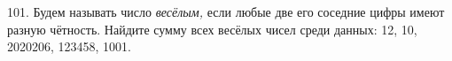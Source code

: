 101. Будем называть число {\it весёлым,} если любые две его соседние цифры имеют разную чётность. Найдите сумму всех весёлых чисел среди данных: 12, 10, 2020206, 123458, 1001.\\
